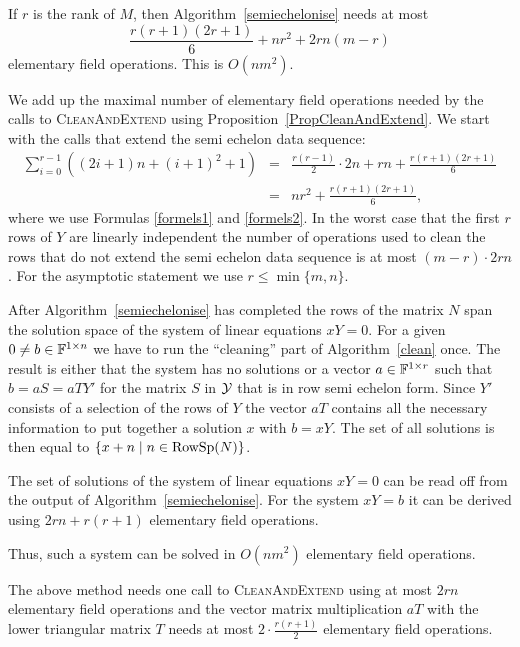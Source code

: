 \begin{Prop}
\label{semiechelon}
If $r$ is the rank of $M$, then Algorithm~\ref{semiechelonise} needs
at most
\[ \frac{r(r+1)(2r+1)}{6} + nr^2 + 2rn(m-r)\]
elementary field operations. This is $O(nm^2)$.
\end{Prop}
\proofbeg
We add up the maximal number of elementary field operations needed
by the calls to \textsc{CleanAndExtend} using
Proposition~\ref{PropCleanAndExtend}. We start with the calls that
extend the semi echelon data sequence:
\begin{eqnarray*}
\sum_{i=0}^{r-1} \left( (2i+1)n + (i+1)^2 + 1 \right) 
  &=& \frac{r(r-1)}{2} \cdot 2n + rn + \frac{r(r+1)(2r+1)}{6} \\
  &=& nr^2 + \frac{r(r+1)(2r+1)}{6},
\end{eqnarray*}
where we use Formulas \ref{formels1} and \ref{formels2}. In the worst
case that the first $r$ rows of $Y$ are linearly independent the
number of operations used to clean the rows that do not extend
the semi echelon data sequence is at most $(m-r)\cdot 2rn$.
For the asymptotic statement we use $r \le \min\{ m,n \}$.
\proofend

\medskip
After Algorithm~\ref{semiechelonise} has completed the rows of the
matrix $N$ span the solution space of the system of linear equations
$xY = 0$. For a given $0 \neq b \in \mathbb{F}^{1 \times n}$ we have to run
the ``cleaning'' part of Algorithm~\ref{clean} once.
The result is either that the system has no solutions or a vector
$a \in \mathbb{F}^{1 \times r}$ such that $b = aS = aTY'$ for the matrix $S$ in
$\mathcal{Y}$ that is in row semi echelon form. Since $Y'$ consists of a 
selection of the rows of $Y$ the vector $aT$ contains all the necessary
information to put together a solution $x$ with $b = xY$. The set
of all solutions is then equal to $\{ x+n \mid n \in \mathrm{RowSp}(N) \}$.

\begin{Cor}
\label{solvelinsys}
The set of solutions of the system of linear equations $xY=0$ can be
read off from the output of Algorithm~\ref{semiechelonise}. For
the system $xY=b$ it can be derived using
$2rn + r(r+1)$ elementary field operations.

Thus, such a system can be solved in $O(nm^2)$ elementary field operations.
\end{Cor}
\proofbeg
The above method needs one call to \textsc{CleanAndExtend} using at most
$2rn$ elementary field operations and the vector matrix multiplication
$aT$ with the lower triangular matrix $T$ needs at most
$2\cdot \frac{r(r+1)}{2}$ elementary field operations.
\proofend

